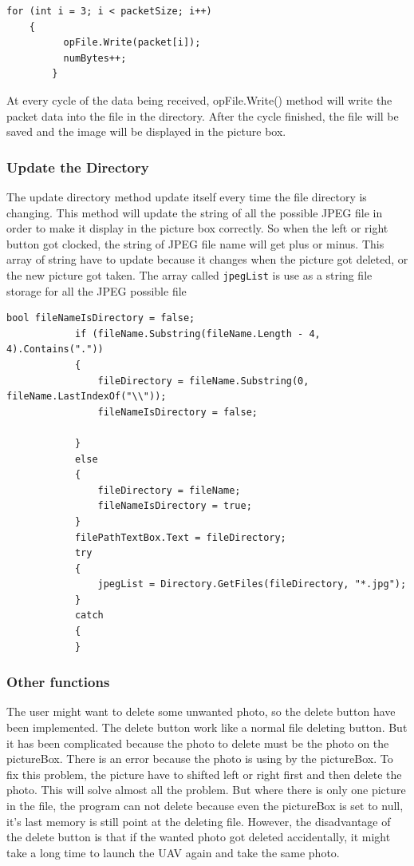 \begin{lstlisting}[caption={writing binary file},label=lst:writingb]          
	for (int i = 3; i < packetSize; i++)
	{
          opFile.Write(packet[i]);
          numBytes++;
    	}
\end{lstlisting}         

       At every cycle of the data being received, opFile.Write() method will write the packet data into the file in the directory. After the cycle finished, the file will be saved and the image will be displayed in the picture box. 
\subsubsection*{Update the Directory}
The update directory method update itself every time the file directory is changing. This method will update the string of all the possible JPEG file in order to make it display in the picture box correctly. So when the left or right button got clocked, the string of JPEG file name will get plus or minus. This array of string have to update because it changes when the picture got deleted, or the new picture got taken. The array called \texttt{jpegList} is use as a string file storage for all the JPEG possible file
\begin{lstlisting}[caption=update directory class highlight, label=updateD]
            bool fileNameIsDirectory = false;
            if (fileName.Substring(fileName.Length - 4, 4).Contains("."))
            {
                fileDirectory = fileName.Substring(0, fileName.LastIndexOf("\\"));
                fileNameIsDirectory = false;

            }
            else
            {
                fileDirectory = fileName;
                fileNameIsDirectory = true;
            }
            filePathTextBox.Text = fileDirectory;
            try
            {
                jpegList = Directory.GetFiles(fileDirectory, "*.jpg");
            }
            catch
            {
            }
\end{lstlisting}
\subsubsection*{Other functions}
The user might want to delete some unwanted photo, so the delete button have been implemented. The delete button work like a normal file deleting button. But it has been complicated because the photo to delete must be the photo on the pictureBox. There is an error because the photo is using by the pictureBox. To fix this problem, the picture have to shifted left or right first and then delete the photo. This will solve almost all the problem. But where there is only one picture in the file, the program can not delete because even the pictureBox is set to null, it's last memory is still point at the deleting file. However, the disadvantage of the delete button is that if the wanted photo got deleted accidentally, it might take a long time to launch the UAV again and take the same photo.

